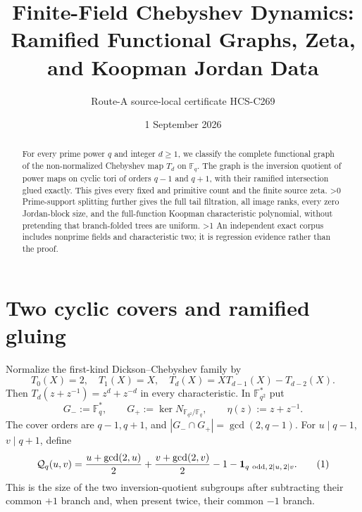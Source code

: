 \documentclass[10pt]{article}
\title{Finite-Field Chebyshev Dynamics:\\Ramified Functional Graphs, Zeta, and Koopman Jordan Data}
\author{Route-A source-local certificate HCS-C269}
\date{1 September 2026}
\providecommand{\CRevisionRound}{2}
\newcommand{\Fq}{\mathbb F_q}
\newcommand{\ind}{\mathbf 1}
\begin{document}
\maketitle
\begin{abstract}
For every prime power $q$ and integer $d\geq1$, we classify the complete
functional graph of the non-normalized Chebyshev map $T_d$ on $\Fq$.
The graph is the inversion quotient of power maps on cyclic tori of orders
$q-1$ and $q+1$, with their ramified intersection glued exactly.
This gives every fixed and primitive count and the finite source zeta.
\ifnum\CRevisionRound>0
Prime-support splitting further gives the full tail filtration, all image
ranks, every zero Jordan-block size, and the full-function Koopman
characteristic polynomial, without pretending that branch-folded trees are
uniform.
\fi
\ifnum\CRevisionRound>1
An independent exact corpus includes nonprime fields and characteristic two;
it is regression evidence rather than the proof.
\fi
\end{abstract}

\section{Two cyclic covers and ramified gluing}
Normalize the first-kind Dickson--Chebyshev family by
\[
 T_0(X)=2,\quad T_1(X)=X,\quad T_d(X)=XT_{d-1}(X)-T_{d-2}(X).
\]
Then $T_d(z+z^{-1})=z^d+z^{-d}$ in every characteristic.  In
$\mathbb F_{q^2}^{*}$ put
\[
 G_-:=\Fq^*,\qquad G_+:=\ker N_{\mathbb F_{q^2}/\Fq},\qquad
 \eta(z):=z+z^{-1}.
\]
The cover orders are $q-1,q+1$, and $|G_-\cap G_+|=\gcd(2,q-1)$.
For $u\mid q-1$, $v\mid q+1$, define
\begin{equation}
 \mathcal Q_q(u,v)=\frac{u+\gcd(2,u)}2+\frac{v+\gcd(2,v)}2-1
 -\ind_{q\ {\rm odd},\,2\mid u,\,2\mid v}.                 \tag{1}
\end{equation}
This is the size of the two inversion-quotient subgroups after subtracting
their common $+1$ branch and, when present twice, their common $-1$ branch.
\end{document}
